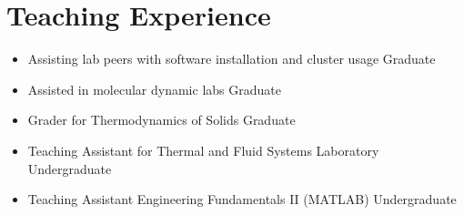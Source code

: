 \section{Teaching Experience}

\begin{itemize}[noitemsep,topsep=0pt]
    \item Assisting lab peers with software installation and cluster usage \hfill Graduate
    \item Assisted in molecular dynamic labs \hfill Graduate
    \item Grader for Thermodynamics of Solids \hfill Graduate
    \item Teaching Assistant for Thermal and Fluid Systems Laboratory \hfill Undergraduate
    \item Teaching Assistant Engineering Fundamentals II (MATLAB) \hfill Undergraduate
\end{itemize}
